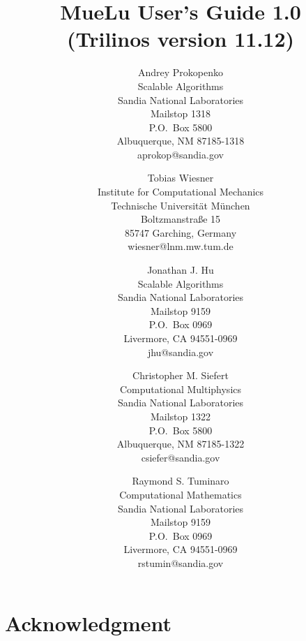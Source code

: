 \documentclass[pdf,12pt,report]{SANDreport}
\title{MueLu User's Guide 1.0 \\
(Trilinos version 11.12)}
\author{Andrey Prokopenko \\
  Scalable Algorithms \\
  Sandia National Laboratories\\
  Mailstop 1318 \\
  P.O.~Box 5800 \\
  Albuquerque, NM 87185-1318\\
  aprokop@sandia.gov\\
  \and
  Tobias Wiesner \\
  Institute for Computational Mechanics \\
  Technische Universit\"at M\"unchen\\
  Boltzmanstra\ss e 15 \\
  85747 Garching, Germany\\
  wiesner@lnm.mw.tum.de\\
  \and
  Jonathan J. Hu \\
  Scalable Algorithms \\
  Sandia National Laboratories\\
  Mailstop 9159 \\
  P.O.~Box 0969 \\
  Livermore, CA 94551-0969\\
  jhu@sandia.gov
  \and
  Christopher M. Siefert\\
  Computational Multiphysics\\
  Sandia National Laboratories\\
  Mailstop 1322 \\
  P.O.~Box 5800 \\
  Albuquerque, NM 87185-1322\\
  csiefer@sandia.gov
  \and
  Raymond S. Tuminaro\\
  Computational Mathematics\\
  Sandia National Laboratories\\
  Mailstop 9159 \\
  P.O.~Box 0969 \\
  Livermore, CA 94551-0969\\
  rstumin@sandia.gov
}
\date{}
\begin{document}
    \maketitle

    \begin{abstract}
	
    \end{abstract}


    \clearpage
    \chapter*{Acknowledgment}
	


    \cleardoublepage		%
    \tableofcontents
    \listoffigures
    \listoftables




\end{document}
